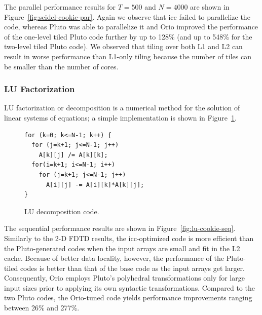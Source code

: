 The parallel performance results for $T=500$ and $N=4000$ are shown in
Figure~\ref{fig:seidel-cookie-par}. Again we observe that icc failed to
parallelize the code, whereas Pluto was able to parallelize it and Orio
improved the performance of the one-level tiled Pluto code further by up to
128\% (and up to 548\% for the two-level tiled Pluto code). We observed that
tiling over both L1 and L2 can result in worse performance than L1-only
tiling because the number of tiles can be smaller than the number of cores.


\subsubsection{LU Factorization}  
 
LU factorization or decomposition is a numerical method for the
solution of linear systems of equations; a simple implementation is
shown in Figure~\ref{fig:lu-code}.
%
\begin{figure}%
\begin{center}
\begin{minipage}{2.8in} 
\scriptsize
\begin{verbatim} 
for (k=0; k<=N-1; k++) { 
  for (j=k+1; j<=N-1; j++) 
    A[k][j] /= A[k][k]; 
  for(i=k+1; i<=N-1; i++) 
    for (j=k+1; j<=N-1; j++) 
      A[i][j] -= A[i][k]*A[k][j]; 
} 
\end{verbatim} 
\end{minipage} 
\end{center}
\caption{LU decomposition code.} 
\label{fig:lu-code} 
\end{figure}
%


The sequential performance results are shown in
Figure~\ref{fig:lu-cookie-seq}. Similarly to the 2-D FDTD results, the icc-optimized code is more
efficient than the Pluto-generated codes when the input arrays are small and
fit in the L2 cache. Because of better data locality, however, the
performance of the Pluto-tiled codes is better than that of the base code as
the input arrays get larger. 
Consequently, Orio employs Pluto's polyhedral transformations only for large
input sizes prior to applying its own syntactic transformations. 
Compared to the two Pluto codes, the
Orio-tuned code yields performance improvements ranging between 26\% and 277\%.

